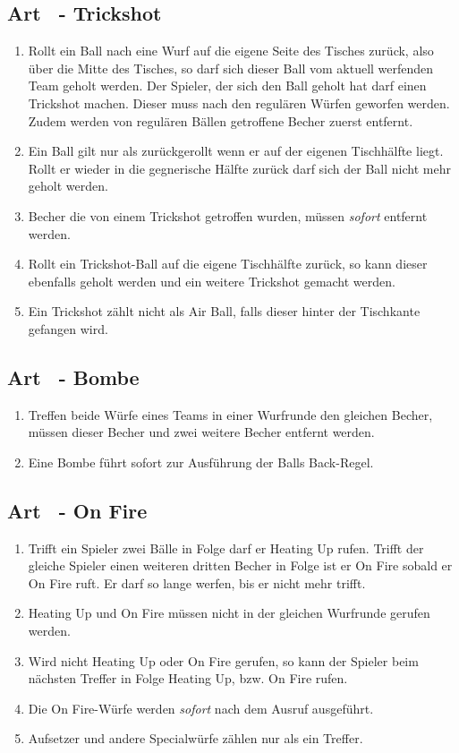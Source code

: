 \documentclass[a4paper,11pt]{scrartcl}
\newcommand{\enum}[1]{\begin{enumerate}[label=(\arabic*)]#1\end{enumerate}}
\newcommand{\art}[2]{\subsection*{#1} \enum{#2}}
\newcommand{\quot}[1]{\glqq #1\grqq}
\newcounter{art}
\begin{document}
    \art{Art \theart\ - \quot{Trickshot}}{
        \item
            Rollt ein Ball nach eine Wurf auf die eigene Seite des Tisches zurück, also über die Mitte des Tisches, so darf sich dieser Ball vom aktuell werfenden Team geholt werden. Der Spieler, der sich den Ball geholt hat darf einen \quot{Trickshot} machen. Dieser muss nach den regulären Würfen geworfen werden. Zudem werden von regulären Bällen getroffene Becher zuerst entfernt.
        \item
            Ein Ball gilt nur als zurückgerollt wenn er auf der eigenen Tischhälfte liegt. Rollt er wieder in die gegnerische Hälfte zurück darf sich der Ball nicht mehr geholt werden.
        \item
            Becher die von einem \quot{Trickshot} getroffen wurden, müssen \emph{sofort} entfernt werden.
        \item
            Rollt ein \quot{Trickshot}-Ball auf die eigene Tischhälfte zurück, so kann dieser ebenfalls geholt werden und ein weitere \quot{Trickshot} gemacht werden.
        \item
            Ein \quot{Trickshot} zählt nicht als \quot{Air Ball}, falls dieser hinter der Tischkante gefangen wird.
    }

    \art{Art \theart\ - \quot{Bombe}}{
        \item
            Treffen beide Würfe eines Teams in einer Wurfrunde den gleichen Becher, müssen dieser Becher und zwei weitere Becher entfernt werden.
        \item
            Eine \quot{Bombe} führt sofort zur Ausführung der \quot{Balls Back}-Regel.
    }

    \art{Art \theart\ - \quot{On Fire}}{
        \item
            Trifft ein Spieler zwei Bälle in Folge darf er \quot{Heating Up} rufen. Trifft der gleiche Spieler einen weiteren dritten Becher in Folge ist er \quot{On Fire} sobald er \quot{On Fire} ruft. Er darf so lange werfen, bis er nicht mehr trifft.
        \item
            \quot{Heating Up} und \quot{On Fire} müssen nicht in der gleichen Wurfrunde gerufen werden.
        \item
            Wird nicht \quot{Heating Up} oder \quot{On Fire} gerufen, so kann der Spieler beim nächsten Treffer in Folge \quot{Heating Up}, bzw. \quot{On Fire} rufen.
        \item
            Die \quot{On Fire}-Würfe werden \emph{sofort} nach dem Ausruf ausgeführt.
        \item
            Aufsetzer und andere Specialwürfe zählen nur als ein Treffer.
    }
\end{document}
